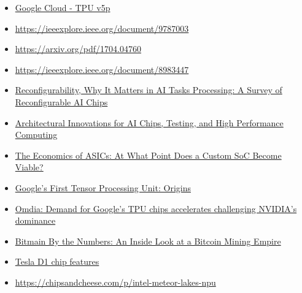 \documentclass[a4paper]{article}
\begin{document}
\begin{itemize}
    \item \href{https://cloud.google.com/tpu/docs/v5p#:~:text=a%203D%20torus.-,Configurations,sized%20slice%20in%20multiple%20ways.}{Google Cloud - TPU v5p}
    \item \href{https://ieeexplore.ieee.org/document/9787003}{https://ieeexplore.ieee.org/document/9787003}
    \item \href{https://arxiv.org/pdf/1704.04760}{https://arxiv.org/pdf/1704.04760}
    \item \href{https://ieeexplore.ieee.org/document/8983447}{https://ieeexplore.ieee.org/document/8983447}
    \item \href{https://ieeexplore.ieee.org/document/9996124}{Reconfigurability, Why It Matters in AI Tasks Processing: A Survey of Reconfigurable AI Chips}
    \item \href{https://www.researchgate.net/publication/388910291_Architectural_Innovations_for_AI_Chips_Testing_and_High_Performance_Computing}{Architectural Innovations for AI Chips, Testing, and High Performance Computing}
    \item \href{https://www.electronicdesign.com/technologies/embedded/article/21808278/ensilica-the-economics-of-asics-at-what-point-does-a-custom-soc-become-viable}{The Economics of ASICs: At What Point Does a Custom SoC Become Viable?}
    \item \href{https://thechipletter.substack.com/p/googles-first-tensor-processing-unit}{Google's First Tensor Processing Unit: Origins}
    \item \href{https://omdia.tech.informa.com/pr/2024/dec/omdia-demand-for-googles-tpu-chips-accelerates-challenging-nvidias-dominance}{Omdia: Demand for Google’s TPU chips accelerates challenging NVIDIA’s dominance}
    \item \href{https://www.coindesk.com/markets/2018/09/27/bitmain-by-the-numbers-an-inside-look-at-a-bitcoin-mining-empire}{Bitmain By the Numbers: An Inside Look at a Bitcoin Mining Empire}
    \item \href{https://videocardz.com/newz/tesla-d1-chip-features-50-billion-transistors-scales-up-to-1-1-exaflops-with-exapod}{Tesla D1 chip features}
    \item \href{https://chipsandcheese.com/p/intel-meteor-lakes-npu}{https://chipsandcheese.com/p/intel-meteor-lakes-npu}
\end{itemize}
\end{document}
